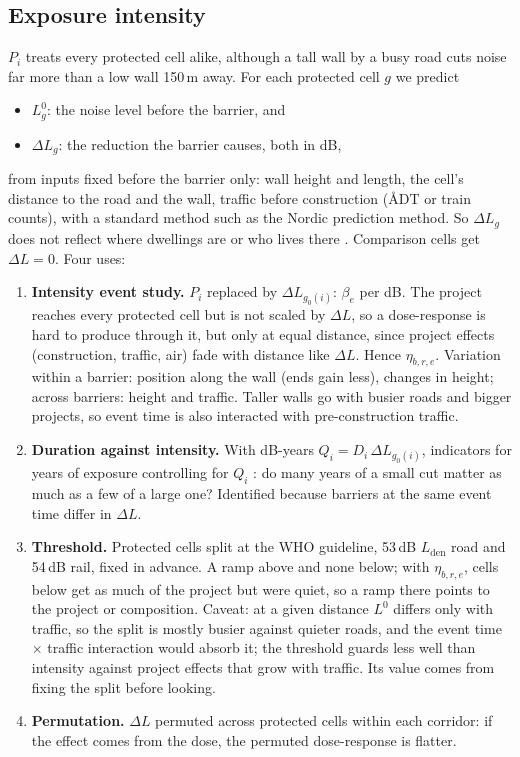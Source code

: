 \documentclass[11pt]{article}
\begin{document}
\subsection{Exposure intensity}\label{sec:intensity}

\(P_i\) treats every protected cell alike, although a tall wall by a busy road cuts noise far
more than a low wall 150\,m away. For each protected cell \(g\) we predict
\begin{itemize}
\item \(L^0_g\): the noise level before the barrier, and
\item \(\Delta L_g\): the reduction the barrier causes, both in dB,
\end{itemize}
from inputs fixed before the barrier only: wall height and length, the cell's distance to the
road and the wall, traffic before construction (ÅDT or train counts), with a standard method
such as the Nordic prediction method. So \(\Delta L_g\) does not reflect where dwellings are or
who lives there \autocite[the logic of the predicted lead change in][]{gronqvistUnderstandingHowLow2020}.
Comparison cells get \(\Delta L = 0\). Four uses:
\begin{enumerate}
\item \textbf{Intensity event study.} \(P_i\) replaced by \(\Delta L_{g_0(i)}\): \(\beta_e\) per dB.
  The project reaches every protected cell but is not scaled by \(\Delta L\), so a dose-response
  is hard to produce through it, but only at equal distance, since project effects (construction,
  traffic, air) fade with distance like \(\Delta L\). Hence \(\eta_{b,r,e}\). Variation within a
  barrier: position along the wall (ends gain less), changes in height; across barriers: height
  and traffic. Taller walls go with busier roads and bigger projects, so event time is also
  interacted with pre-construction traffic.
\item \textbf{Duration against intensity.} With dB-years \(Q_i = D_i\, \Delta L_{g_0(i)}\),
  indicators for years of exposure controlling for \(Q_i\)
  \autocite{hollingsworthThousandCutsCumulative2025}: do many years of a small cut matter as much
  as a few of a large one? Identified because barriers at the same event time differ in
  \(\Delta L\).
\item \textbf{Threshold.} Protected cells split at the WHO guideline, 53\,dB \(L_{\text{den}}\)
  road and 54\,dB rail, fixed in advance. A ramp above and none below; with \(\eta_{b,r,e}\),
  cells below get as much of the project but were quiet, so a ramp there points to the project
  or composition. Caveat: at a given distance \(L^0\) differs only with traffic, so the split is
  mostly busier against quieter roads, and the event time \(\times\) traffic interaction would
  absorb it; the threshold guards less well than intensity against project effects that grow
  with traffic. Its value comes from fixing the split before looking.
\item \textbf{Permutation.} \(\Delta L\) permuted across protected cells within each corridor:
  if the effect comes from the dose, the permuted dose-response is flatter.
\end{enumerate}
\end{document}

